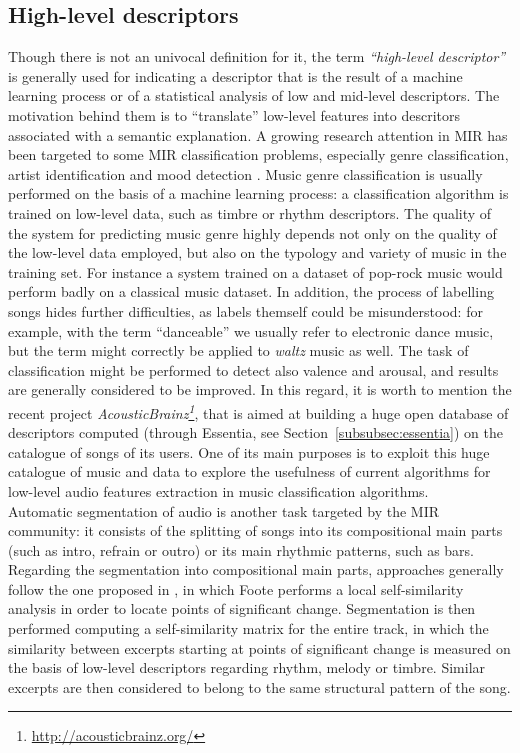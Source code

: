 \subsection{High-level descriptors}
Though there is not an univocal definition for it, the term \textit{``high-level descriptor''} is generally used for indicating a descriptor that is the result of a machine learning process or of a statistical analysis of low and mid-level descriptors. The motivation behind them is to ``translate'' low-level features into descritors associated with a semantic explanation. A growing research attention in MIR has been targeted to some MIR classification problems, especially genre classification, artist identification and mood detection \cite{dimi10}. Music genre classification is usually performed on the basis of a machine learning process: a classification algorithm is trained on low-level data, such as timbre or rhythm descriptors. The quality of the system for predicting music genre highly depends not only on the quality of the low-level data employed, but also on the typology and variety of music in the training set. For instance a system trained on a dataset of pop-rock music would perform badly on a classical music dataset. In addition, the process of labelling songs hides further difficulties, as labels themself could be misunderstood: for example, with the term ``danceable'' we usually refer to electronic dance music, but the term might correctly be applied to \textit{waltz} music as well. The task of classification might be performed to detect also valence and arousal, and results are generally considered to be improved. In this regard, it is worth to mention the recent project \textit{AcousticBrainz\footnote{\url{http://acousticbrainz.org/}}}, that is aimed at building a huge open database of descriptors computed (through Essentia, see Section~\ref{subsubsec:essentia}) on the catalogue of songs of its users. One of its main purposes is to exploit this huge catalogue of music and data to explore the usefulness of current algorithms for low-level audio features extraction in music classification algorithms. \\
Automatic segmentation of audio is another task targeted by the MIR community: it consists of the splitting of songs into its compositional main parts (such as intro, refrain or outro) or its main rhythmic patterns, such as bars. Regarding the segmentation into compositional main parts, approaches generally follow the one proposed in \cite{foote00}, in which Foote performs a local self-similarity analysis in order to locate points of significant change. Segmentation is then performed computing a self-similarity matrix for the entire track, in which the similarity between excerpts starting at points of significant change is measured on the basis of low-level descriptors regarding rhythm, melody or timbre. Similar excerpts are then considered to belong to the same structural pattern of the song. 


